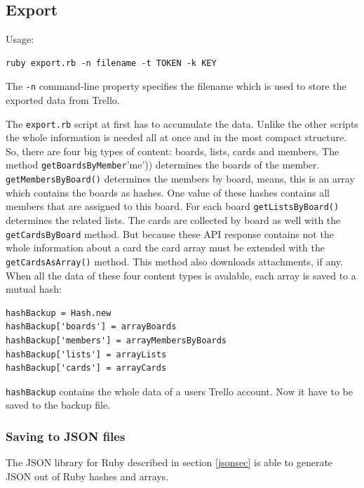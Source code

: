 \subsection{Export}
Usage:
\begin{lstlisting}[aboveskip=1\baselineskip, style=bash, caption=\texttt{export.rb} usage., label=listing037]
ruby export.rb -n filename -t TOKEN -k KEY
\end{lstlisting}

The \texttt{-n} command-line property specifies the filename which is used to store the exported data from Trello.

The \texttt{export.rb} script at first has to accumulate the data. Unlike the other scripts the whole information is needed all at once and in the most compact structure. So, there are four big types of content: boards, lists, cards and members. The method \lstinline(getBoardsByMember('me')) determines the boards of the member. \lstinline{getMembersByBoard()} determines the members by board, means, this is an array which contains the boards as hashes. One value of these hashes contains all members that are assigned to this board. For each board \lstinline{getListsByBoard()} determines the related lists. The cards are collected by board as well with the \lstinline{getCardsByBoard} method. But because these API response contains not the whole information about a card the card array must be extended with the \lstinline{getCardsAsArray()} method. This method also downloads attachments, if any.  When all the data of these four content types is avalable, each array is saved to a mutual hash:

\begin{lstlisting}[aboveskip=1\baselineskip, caption=\texttt{joomlaMultiple.rb} usage., label=listing038]
hashBackup = Hash.new
hashBackup['boards'] = arrayBoards
hashBackup['members'] = arrayMembersByBoards
hashBackup['lists'] = arrayLists
hashBackup['cards'] = arrayCards
\end{lstlisting}

\lstinline{hashBackup} contains the whole data of a users Trello account. Now it have to be saved to the backup file. 

\subsubsection{Saving to JSON files}
The JSON library for Ruby described in section \ref{jsonsec} is able to generate JSON out of Ruby hashes and arrays.

